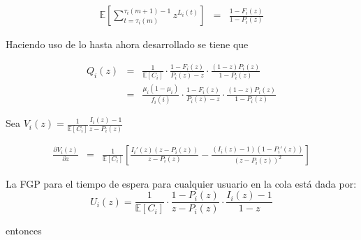 \documentclass{article}
\newcommand{\esp}{\mathbb{E}}
\begin{document}
\begin{eqnarray*}
\esp\left[\sum_{t=\tau_{i}\left(m\right)}^{\tau_{i}\left(m+1\right)-1}z^{L_{i}\left(t\right)}\right]&=&\frac{1-F_{i}\left(z\right)}{1-P_{i}\left(z\right)}
\end{eqnarray*}

Haciendo uso de lo hasta ahora desarrollado se tiene que

\begin{eqnarray*}
Q_{i}\left(z\right)&=&\frac{1}{\esp\left[C_{i}\right]}\cdot\frac{1-F_{i}\left(z\right)}{P_{i}\left(z\right)-z}\cdot\frac{\left(1-z\right)P_{i}\left(z\right)}{1-P_{i}\left(z\right)}\\
&=&\frac{\mu_{i}\left(1-\mu_{i}\right)}{f_{i}\left(i\right)}\cdot\frac{1-F_{i}\left(z\right)}{P_{i}\left(z\right)-z}\cdot\frac{\left(1-z\right)P_{i}\left(z\right)}{1-P_{i}\left(z\right)}
\end{eqnarray*}



Sea
$V_{i}\left(z\right)=\frac{1}{\esp\left[C_{i}\right]}\frac{I_{i}\left(z\right)-1}{z-P_{i}\left(z\right)}$


\begin{eqnarray*}
\frac{\partial V_{i}\left(z\right)}{\partial z}&=&\frac{1}{\esp\left[C_{i}\right]}\left[\frac{I_{i}{'}\left(z\right)\left(z-P_{i}\left(z\right)\right)}{z-P_{i}\left(z\right)}-\frac{\left(I_{i}\left(z\right)-1\right)\left(1-P_{i}{'}\left(z\right)\right)}{\left(z-P_{i}\left(z\right)\right)^{2}}\right]
\end{eqnarray*}


La FGP para el tiempo de espera para cualquier usuario en la cola est\'a dada por:
\[U_{i}\left(z\right)=\frac{1}{\esp\left[C_{i}\right]}\cdot\frac{1-P_{i}\left(z\right)}{z-P_{i}\left(z\right)}\cdot\frac{I_{i}\left(z\right)-1}{1-z}\]

entonces
\end{document}
